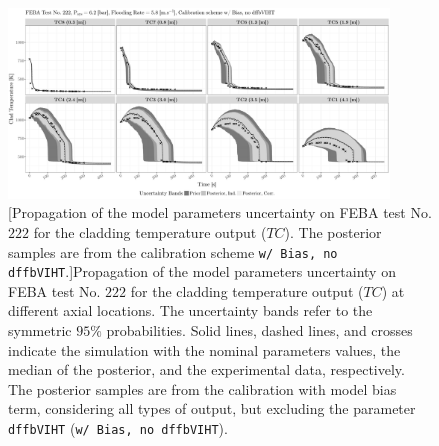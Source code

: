 \clearpage
\begin{figure}
	\centering
	\includegraphics[width=0.90\textwidth]{../figures/chapter5/figures/plotTraceUQPosteriorAllDiscCenteredNoParam8TC222}
		[Propagation of the model parameters uncertainty on FEBA test No. $222$ for the cladding temperature output ($TC$). The posterior samples are from the calibration scheme \texttt{w/ Bias, no dffbVIHT}.]{Propagation of the model parameters uncertainty on FEBA test No. $222$ for the cladding temperature output ($TC$) at different axial locations. The uncertainty bands refer to the symmetric $95\%$ probabilities. Solid lines, dashed lines, and crosses indicate the simulation with the nominal parameters values, the median of the posterior, and the experimental data, respectively. The posterior samples are from the calibration with model bias term, considering all types of output, but excluding the parameter \texttt{dffbVIHT} (\texttt{w/ Bias, no dffbVIHT}).}
	\label{fig:ch5_plot_trace_uq_post_tc_222_noparam8}
\end{figure}
\clearpage

